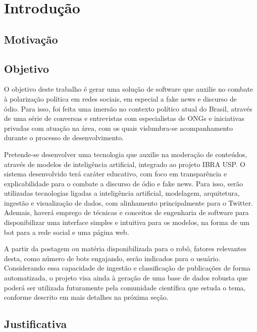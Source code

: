 \chapter{Introdução}
	
\section{Motivação}

\section{Objetivo}

O objetivo deste trabalho é gerar uma solução de software que auxilie no combate à polarização política em redes sociais, em especial a fake news e discurso de ódio. 
Para isso, foi feita uma imersão no contexto político atual do Brasil, através de uma série de conversas e entrevistas com especialistas de ONGs e iniciativas privadas com atuação 
na área, com os quais vislumbra-se acompanhamento durante o processo de desenvolvimento.

Pretende-se desenvolver uma tecnologia que auxilie na moderação de conteúdos, através de modelos de inteligência artificial, integrado ao projeto IBRA USP. O sistema 
desenvolvido terá caráter educativo, com foco em transparência e explicabilidade para o combate a discurso de ódio e fake news. Para isso, serão utilizadas tecnologias ligadas 
a inteligência artificial, modelagem, arquitetura, ingestão e visualização de dados, com alinhamento principalmente para o Twitter. Ademais, haverá emprego de técnicas e 
conceitos de engenharia de software para disponibilizar uma interface simples e intuitiva para os modelos, na forma de um bot para a rede social e uma página web. 

A partir da postagem ou matéria disponibilizada para o robô, fatores relevantes desta, como número de bots engajando, serão indicados para o usuário. 
Considerando essa capacidade de ingestão e classificação de publicações de forma automatizada, o projeto visa ainda à geração de uma base de dados robusta que poderá ser 
utilizada futuramente pela comunidade científica que estuda o tema, conforme descrito em mais detalhes na próxima seção.

\section{Justificativa}
